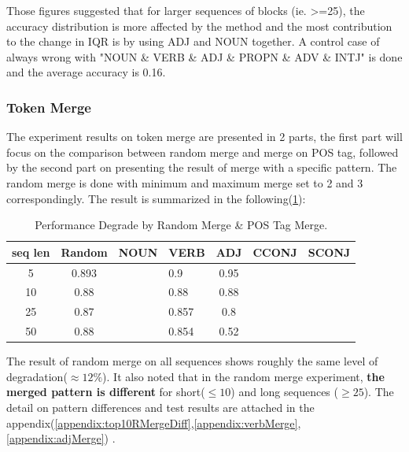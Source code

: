 \documentclass[12pt]{article}
\begin{document}
Those figures suggested that for larger sequences of blocks (ie. >=25), the accuracy distribution is more affected by the method and the most contribution to the change in IQR is by using ADJ and NOUN together.
A control case of always wrong with "NOUN \& VERB \& ADJ \& PROPN \& ADV \& INTJ" is done and the average accuracy is 0.16. 

\subsubsection{Token Merge}
The experiment results on token merge are presented in 2 parts, the first part will focus on the comparison between random merge and merge on POS tag, followed by the second part on presenting the result of merge with a specific pattern. The random merge is done with minimum and maximum merge set to 2 and 3 correspondingly. The result is summarized in the following(\ref{tab:mergeDegrade}):

\begin{table}[!h]
\fontsize{10pt}{10pt}\selectfont
\begin{tabular}{|c|c|c|l|c|l|l|}
\hline
seq len & Random & NOUN & VERB  & ADJ  & CCONJ & SCONJ \\ \hline
5       & 0.893  &      & 0.9   & 0.95 &       &       \\ \hline
10      & 0.88   &      & 0.88  & 0.88 &       &       \\ \hline
25      & 0.87   &      & 0.857 & 0.8  &       &       \\ \hline
50      & 0.88   &      & 0.854 & 0.52 &       &       \\ \hline
\end{tabular}
\caption{Performance Degrade by Random Merge \& POS Tag Merge.}
\label{tab:mergeDegrade}
\end{table}
The result of random merge on all sequences shows roughly the same level of degradation($\approx12\%$). It also noted that in the random merge experiment, \textbf{the merged pattern is different} for short($\leq10$) and long sequences ($\geq25$). The detail on pattern differences and test results are attached in the appendix(\ref{appendix:top10RMergeDiff},\ref{appendix:verbMerge},\ref{appendix:adjMerge}) .\\
\end{document}
